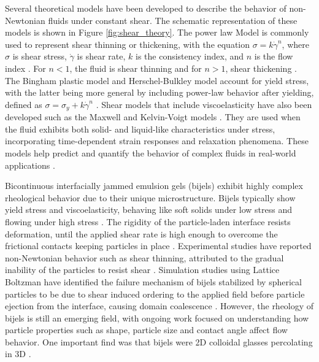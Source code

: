 Several theoretical models have been developed to describe the behavior of non-Newtonian fluids under constant shear. The schematic representation of these models is shown in
Figure \ref{fig:shear_theory}. The power law Model is commonly used to represent shear thinning or 
thickening, with the equation \(\sigma = k \dot{\gamma}^n\), where \(\sigma\) is shear stress, \(\dot{\gamma}\) is shear rate, \(k\) is the consistency index, and \(n\) is the flow index 
\cite{mezger_rheology_2020}.
For \(n<1\), the fluid is shear thinning and for \(n>1\), shear thickening \cite{mezger_rheology_2020}.
The Bingham plastic model and Herschel-Bulkley model account for yield stress, with the latter being more general by 
including power-law behavior after yielding, defined as $\sigma = \sigma_y + k \dot{\gamma}^n$ \cite{mezger_rheology_2020}.
Shear models that include viscoelasticity have also been developed such as the  Maxwell and Kelvin-Voigt 
models \cite{mezger_rheology_2020}.
They are used when the fluid exhibits both solid- and liquid-like characteristics under stress, incorporating time-dependent strain responses and relaxation phenomena. These models help 
predict and quantify the behavior of complex fluids in real-world applications \cite{mezger_rheology_2020}. 

Bicontinuous interfacially jammed emulsion gels (bijels) exhibit highly complex rheological behavior due to their unique microstructure. Bijels typically show yield stress and viscoelasticity, 
behaving like soft solids under low stress and flowing under high stress \cite{macmillan_rheological_2019, bai_dynamics_2015, lee_making_2013}.  The rigidity of the 
particle-laden interface resists deformation, until the applied shear rate is high enough to overcome the frictional contacts keeping particles in place \cite{boakye-ansah_controlling_2020}. 
Experimental studies have reported non-Newtonian behavior such as shear thinning, attributed to the gradual inability of the particles to resist shear \cite{macmillan_rheological_2019}.
Simulation studies using Lattice Boltzman have identified the failure mechanism of bijels stabilized by spherical particles to be due to shear induced ordering to the applied field before
particle ejection from the interface, causing domain coalescence \cite{bonaccorso_shear_2020}. However, the rheology of bijels is still an emerging field, 
with ongoing work focused on understanding how particle properties such as shape, particle size and contact angle affect flow behavior. One important find was that bijels were 
2D colloidal glasses percolating in 3D \cite{ching_bijel_2022}. 

